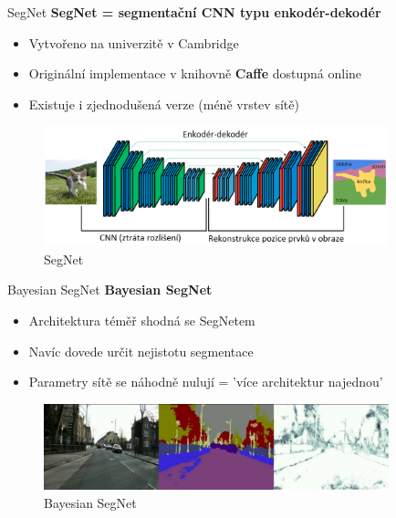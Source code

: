 \documentclass[aspectratio=1610]{beamer}
\begin{document}
\begin{frame}{SegNet}
\textbf{SegNet = segmentační CNN typu enkodér-dekodér}
\begin{itemize}
	\item Vytvořeno na univerzitě v Cambridge
	\item Originální implementace v knihovně \textbf{Caffe} dostupná online	
	\item Existuje i zjednodušená verze (méně vrstev sítě)
\end{itemize}
\begin{figure}[h]
	\begin{center}
		\includegraphics[width=10cm, keepaspectratio]{segnet.png}
	\end{center}
	\caption{SegNet} 	
\end{figure}
\end{frame}
\begin{frame}{Bayesian SegNet}
\textbf{Bayesian SegNet}
\begin{itemize}
	\item Architektura téměř shodná se SegNetem 
	\item Navíc dovede určit nejistotu segmentace
	\item Parametry sítě se náhodně nulují = 'více architektur najednou'
\end{itemize}
\vspace{5mm}
\begin{figure}[h]
	\begin{center}
		\includegraphics[width=10cm, keepaspectratio]{bayesian.jpg}
	\end{center}
	\caption{Bayesian SegNet} 	
\end{figure}
\end{frame}
\end{document}
